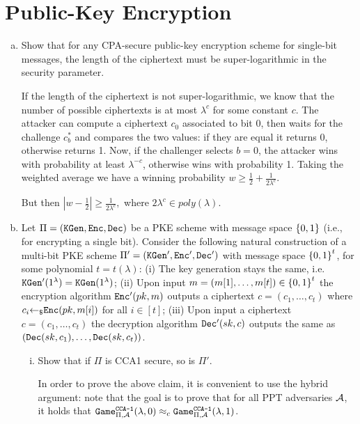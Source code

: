 \section{ Public-Key Encryption}
\begin{enumerate}[(a)]
	\item Show that for any CPA-secure public-key encryption scheme for single-bit messages, the length of the ciphertext must be super-logarithmic in the security parameter.

	\begin{solution}
		If the length of the ciphertext is not super-logarithmic, we know that the number of possible ciphertexts is at most $\lambda^c$ for some constant $c$. The attacker can compute a ciphertext $c_0$ associated to bit 0, then waits for the challenge $c_b^*$ and compares the two values: if they are equal it returns 0, otherwise returns 1. Now, if the challenger selects $b = 0$, the attacker wins with probability at least $\lambda^{-c}$, otherwise wins with probability 1. Taking the weighted average we have a winning probability $w \ge \frac{1}{2} + \frac{1}{2\lambda^c}$.
		
		But then $|w - \frac{1}{2}| \ge \frac{1}{2\lambda^c},$ where $2\lambda^c \in poly(\lambda)$.
	\end{solution}
	
	\item Let $\Pi = (\texttt{KGen}, \texttt{Enc}, \texttt{Dec})$ be a PKE scheme with message space ${\{0, 1\}}$ (i.e., for encrypting a single bit). Consider the following natural construction of a multi-bit PKE scheme $\Pi' = (\texttt{KGen}', \texttt{Enc}', \texttt{Dec}')$ with message space ${\{0, 1\}}^t$, for some polynomial
	$t = t(\lambda)$: (i) The key generation stays the same, i.e. $\texttt{KGen}'(1^\lambda) = \texttt{KGen}(1^\lambda)$; (ii) Upon input $m = (m[1], \dots,m[t]) \in {\{0, 1\}}^t$ the encryption algorithm $\texttt{Enc}'(pk, m)$ outputs a ciphertext $c = (c_1, \dots, c_t)$ where $c_i {\leftarrow_\$} \texttt{Enc}(pk, m[i])$ for all $i \in [t]$; (iii) Upon input a ciphertext $c = (c_1,\dots, c_t)$ the decryption algorithm $\texttt{Dec}'(sk, c)$ outputs the same as $(\texttt{Dec}(sk, c_1), \dots, \texttt{Dec}(sk, c_t))$.
	
	\begin{enumerate}[(i)]
		\item Show that if $\Pi$ is CCA1 secure, so is $\Pi'$.
		
		\begin{solution}
			In order to prove the above claim, it is convenient to use the hybrid argument: note that the goal is to prove that for all PPT adversaries $\mathcal{A}$, it holds that $\texttt{Game}_{\Pi, \mathcal{A}}^\texttt{CCA-1}(\lambda, 0) \approx_c \texttt{Game}_{\Pi, \mathcal{A}}^\texttt{CCA-1}(\lambda, 1)$.  
			

\end{solution}
\end{enumerate}
\end{enumerate}
